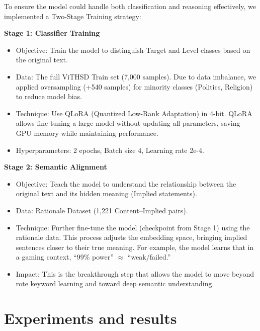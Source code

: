 \documentclass[11pt]{article}
\begin{document}
To ensure the model could handle both classification and reasoning effectively, we
implemented a Two-Stage Training strategy:

\textbf{Stage 1: Classifier Training}
\begin{itemize}[leftmargin=*]
\item Objective: Train the model to distinguish Target and Level classes based on the original
text.
\item Data: The full ViTHSD Train set (7,000 samples). Due to data imbalance, we applied
oversampling (+540 samples) for minority classes (Politics, Religion) to reduce model
bias.
\item Technique: Use QLoRA (Quantized Low-Rank Adaptation) \citep{dettmers2023qlora} in 4-bit. QLoRA allows
fine-tuning a large model without updating all parameters, saving GPU memory while
maintaining performance.
\item Hyperparameters: 2 epochs, Batch size 4, Learning rate 2e-4.
\end{itemize}

\textbf{Stage 2: Semantic Alignment}
\begin{itemize}[leftmargin=*]
\item Objective: Teach the model to understand the relationship between the original text
and its hidden meaning (Implied statements).
\item Data: Rationale Dataset (1,221 Content–Implied pairs).
\item Technique: Further fine-tune the model (checkpoint from Stage 1) using the rationale
data. This process adjusts the embedding space, bringing implied sentences closer to
their true meaning. For example, the model learns that in a gaming context, ``99\%
power'' $\approx$ ``weak/failed.''
\item Impact: This is the breakthrough step that allows the model to move beyond rote
keyword learning and toward deep semantic understanding.
\end{itemize}

\section{Experiments and results}
\end{document}
